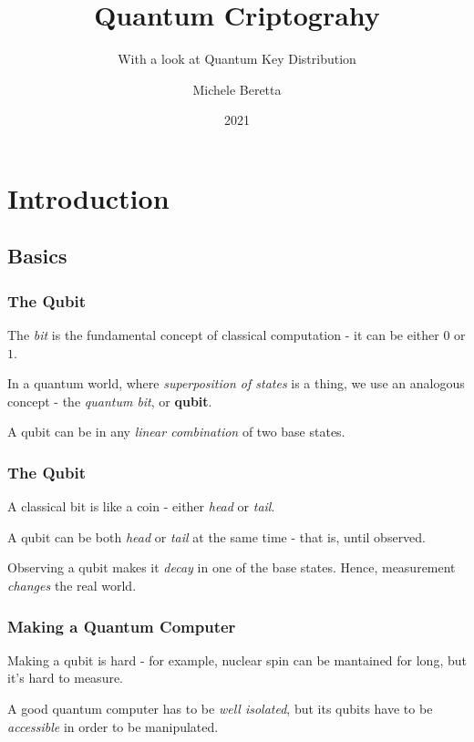 \documentclass{beamer}
\title{Quantum Criptograhy}
\subtitle{With a look at Quantum Key Distribution}
\author{Michele Beretta}
\institute{UniBG}
\date{2021}
\begin{document}
  \frame{\titlepage}


  \section{Introduction}
  \subsection{Basics}
  \begin{frame}
    \frametitle{The Qubit}
    The \textit{bit} is the fundamental concept of classical computation - it can be either $0$ or $1$.

    In a quantum world, where \textit{superposition of states} is a thing, we use an analogous concept -
    the \textit{quantum bit}, or \textbf{qubit}.

    A qubit can be in any \textit{linear combination} of two base states.
  \end{frame}
  \begin{frame}
    \frametitle{The Qubit}
    A classical bit is like a coin - either \textit{head} or \textit{tail}.

    A qubit can be both \textit{head} or \textit{tail} at the same time - that is, until observed.

    Observing a qubit makes it \textit{decay} in one of the base states. Hence, measurement
    \textit{changes} the real world.
  \end{frame}
  \begin{frame}
    \frametitle{Making a Quantum Computer}
    Making a qubit is hard - for example, nuclear spin can be mantained for long, but it's hard to measure.

    A good quantum computer has to be \textit{well isolated}, but its qubits have to be \textit{accessible}
    in order to be manipulated.
  \end{frame}
  
\end{document}
